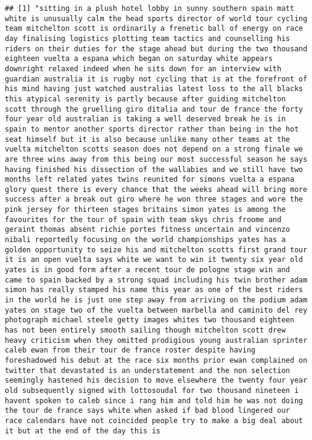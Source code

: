 \documentclass[]{article}
\newenvironment{Shaded}{\begin{snugshade}}{\end{snugshade}}
\newcommand{\DecValTok}[1]{\textcolor[rgb]{0.00,0.00,0.81}{#1}}
\newcommand{\OperatorTok}[1]{\textcolor[rgb]{0.81,0.36,0.00}{\textbf{#1}}}
\newcommand{\NormalTok}[1]{#1}
\begin{document}
\begin{Shaded}
\end{Shaded}

\begin{verbatim}
## [1] "sitting in a plush hotel lobby in sunny southern spain matt white is unusually calm the head sports director of world tour cycling team mitchelton scott is ordinarily a frenetic ball of energy on race day finalising logistics plotting team tactics and counselling his riders on their duties for the stage ahead but during the two thousand eighteen vuelta a espana which began on saturday white appears downright relaxed indeed when he sits down for an interview with guardian australia it is rugby not cycling that is at the forefront of his mind having just watched australias latest loss to the all blacks this atypical serenity is partly because after guiding mitchelton scott through the gruelling giro ditalia and tour de france the forty four year old australian is taking a well deserved break he is in spain to mentor another sports director rather than being in the hot seat himself but it is also because unlike many other teams at the vuelta mitchelton scotts season does not depend on a strong finale we are three wins away from this being our most successful season he says having finished his dissection of the wallabies and we still have two months left related yates twins reunited for simons vuelta a espana glory quest there is every chance that the weeks ahead will bring more success after a break out giro where he won three stages and wore the pink jersey for thirteen stages britains simon yates is among the favourites for the tour of spain with team skys chris froome and geraint thomas absent richie portes fitness uncertain and vincenzo nibali reportedly focusing on the world championships yates has a golden opportunity to seize his and mitchelton scotts first grand tour it is an open vuelta says white we want to win it twenty six year old yates is in good form after a recent tour de pologne stage win and came to spain backed by a strong squad including his twin brother adam simon has really stamped his name this year as one of the best riders in the world he is just one step away from arriving on the podium adam yates on stage two of the vuelta between marbella and caminito del rey photograph michael steele getty images whites two thousand eighteen has not been entirely smooth sailing though mitchelton scott drew heavy criticism when they omitted prodigious young australian sprinter caleb ewan from their tour de france roster despite having foreshadowed his debut at the race six months prior ewan complained on twitter that devastated is an understatement and the non selection seemingly hastened his decision to move elsewhere the twenty four year old subsequently signed with lottosoudal for two thousand nineteen i havent spoken to caleb since i rang him and told him he was not doing the tour de france says white when asked if bad blood lingered our race calendars have not coincided people try to make a big deal about it but at the end of the day this is 
\end{verbatim}
\end{document}
